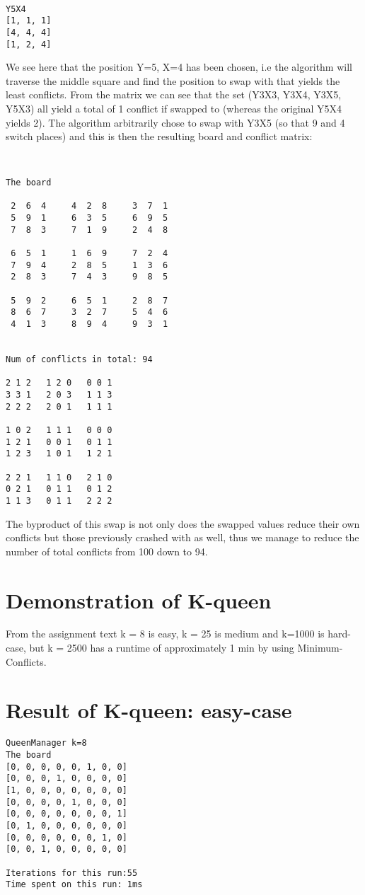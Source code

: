 \documentclass[12pt, a4paper]{article}
\begin{document}
\begin{verbatim}

Y5X4
[1, 1, 1]
[4, 4, 4]
[1, 2, 4]

\end{verbatim}
\noindent
We see here that the position Y=5, X=4 has been chosen, i.e the algorithm will traverse the middle square and find the position to swap with that yields the least conflicts.
From the matrix we can see that the set (Y3X3, Y3X4, Y3X5, Y5X3) all yield a total of 1 conflict if swapped to (whereas the original Y5X4 yields 2). The algorithm arbitrarily chose to swap with Y3X5 (so that 9 and 4 switch places) and this is then the resulting board and conflict matrix:

\begin{verbatim}


The board

 2  6  4     4  2  8     3  7  1 
 5  9  1     6  3  5     6  9  5 
 7  8  3     7  1  9     2  4  8 

 6  5  1     1  6  9     7  2  4 
 7  9  4     2  8  5     1  3  6 
 2  8  3     7  4  3     9  8  5 

 5  9  2     6  5  1     2  8  7 
 8  6  7     3  2  7     5  4  6 
 4  1  3     8  9  4     9  3  1 


Num of conflicts in total: 94

2 1 2 	1 2 0 	0 0 1 
3 3 1 	2 0 3 	1 1 3 
2 2 2 	2 0 1 	1 1 1 

1 0 2 	1 1 1 	0 0 0 
1 2 1 	0 0 1 	0 1 1 
1 2 3 	1 0 1 	1 2 1 

2 2 1 	1 1 0 	2 1 0 
0 2 1 	0 1 1 	0 1 2 
1 1 3 	0 1 1 	2 2 2 

\end{verbatim}

\noindent 
The byproduct of this swap is not only does the swapped values reduce their own conflicts but those previously crashed with as well, thus we manage to reduce the number of total conflicts from 100 down to 94.

\section{Demonstration of K-queen}
From the assignment text k = 8 is easy, k = 25 is medium and k=1000 is hard-case, but k = 2500 has a runtime of approximately 1 min by using Minimum-Conflicts.

\section{Result of K-queen: easy-case}
\begin{verbatim}
QueenManager k=8
The board 
[0, 0, 0, 0, 0, 1, 0, 0]
[0, 0, 0, 1, 0, 0, 0, 0]
[1, 0, 0, 0, 0, 0, 0, 0]
[0, 0, 0, 0, 1, 0, 0, 0]
[0, 0, 0, 0, 0, 0, 0, 1]
[0, 1, 0, 0, 0, 0, 0, 0]
[0, 0, 0, 0, 0, 0, 1, 0]
[0, 0, 1, 0, 0, 0, 0, 0]

Iterations for this run:55
Time spent on this run: 1ms
\end{verbatim}
\end{document}
